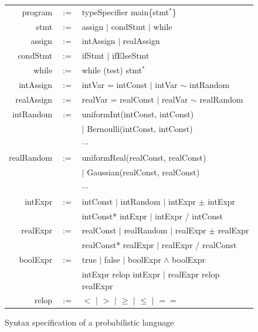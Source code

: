 \documentclass[runningheads]{llncs}
\begin{document}
\begin{figure}[ht]
	\centering
	\begin{tabular}{rcl}
		\hline
		program & $:=$ & typeSpecifier main\{stmt$^*$\} \\
		stmt & $:=$ & assign $\mid$ condStmt $\mid$ while \\
		assign & $:=$ & intAssign $\mid$ realAssign \\
		condStmt & $:=$ & ifStmt $\mid$ ifElseStmt\\
		while & $:=$ & while (test) stmt$^*$\\
		intAssign & $:=$ &  intVar = intConst $\mid$ intVar $\sim$ intRandom\\
		realAssign & $:=$ & realVar = realConst $\mid$ realVar $\sim$ realRandom\\
		intRandom & $:=$ & uniformInt(intConst, intConst)\\
		&  & $\mid$ Bernoulli(intConst, intConst)\\
		&  & $\cdots$ \\
		realRandom & $:=$ & uniformReal(realConst, realConst)\\
		&  & $\mid$ Gaussian(realConst, realConst)\\
		&  & $\cdots$ \\
		intExpr & $:=$ & intConst $\mid$ intRandom $\mid$ intExpr $\pm$ intExpr\\
		& & intConst* intExpr $\mid$ intExpr / intConst\\
		realExpr & $:=$ & realConst $\mid$ realRandom $\mid$ realExpr $\pm$ realExpr\\
		& & realConst* realExpr $\mid$ realExpr / realConst\\
		boolExpr& $:=$ & true $\mid$ false $\mid$ boolExpr $\wedge$ boolExpr \\
		& & intExpr relop intExpr $\mid$ realExpr relop realExpr\\
		relop & $:=$ & $<$  $\mid$  $>$ $\mid$ $\geq$ $\mid$ $\leq$ $\mid$ $==$\\
		\hline
	\end{tabular}
	\caption{Syntax specification of a probabilistic language}	\label{syntax}
\end{figure}
\end{document}
